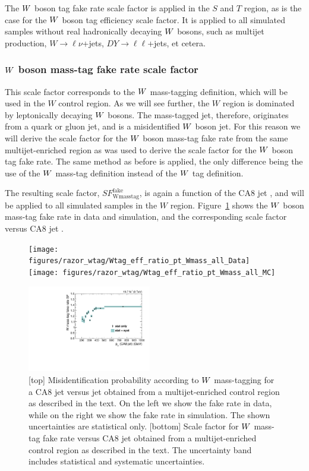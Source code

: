 The $W$ boson tag fake rate scale factor is applied in the $S$ and $T$ region, as is the case for
the $W$ boson tag efficiency scale factor. It is applied to all simulated samples without real
hadronically decaying $W$ bosons, such as multijet production, $W\rightarrow\ell\nu$+jets,
$DY\rightarrow\ell\ell$+jets, et cetera. 

\subsubsection{\texorpdfstring{$W$}{W} boson mass-tag fake rate scale factor
\label{sec:wmasstag_fake_sf}}

This scale factor corresponds to the $W$ mass-tagging definition, which will be used in the $W$
control region. As we will see further, the $W$ region is dominated by leptonically decaying $W$
bosons. The mass-tagged jet, therefore, originates from a quark or gluon jet, and is a
misidentified $W$ boson jet. For this reason we will derive the scale factor for the $W$ boson
mass-tag fake rate from the same multijet-enriched region as was used to derive the scale factor for
the $W$ boson tag fake rate. The same method as before is applied, the only difference being
the use of the $W$ mass-tag definition instead of the $W$ tag definition. 

The resulting scale factor, $SF_\textrm{Wmasstag}^\textrm{fake}$, is again a function of the CA8
jet \pt, and will be applied to all simulated samples in the $W$ region.
Figure~\ref{fig:boost_wmasstag} shows the $W$ boson mass-tag fake rate in data and
simulation, and the corresponding scale factor versus CA8 jet \pt.

\begin{figure}[htbp]
\centering
\texttt{[image: figures/razor\_wtag/Wtag\_eff\_ratio\_pt\_Wmass\_all\_Data]}
\texttt{[image: figures/razor\_wtag/Wtag\_eff\_ratio\_pt\_Wmass\_all\_MC]}

\includegraphics[width=0.48\textwidth]{figures/razor_wtag/SF_Wmass_Thesis}
\caption{[top] Misidentification probability according to $W$ mass-tagging for a CA8 jet versus
jet \pt obtained from a multijet-enriched control region as described in the text. On the left
we show the fake rate in data, while on the right we show the fake rate in simulation. The shown
uncertainties are statistical only.
[bottom] Scale factor for $W$ mass-tag fake rate versus CA8 jet \pt obtained from a
multijet-enriched control region as described in the text. The uncertainty band includes
statistical and systematic uncertainties.
\label{fig:boost_wmasstag}}
\end{figure}

